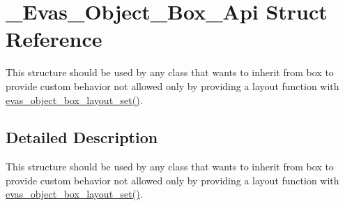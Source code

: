 \section{\_\-Evas\_\-Object\_\-Box\_\-Api Struct Reference}
\label{struct__Evas__Object__Box__Api}


This structure should be used by any class that wants to inherit from box to provide custom behavior not allowed only by providing a layout function with \hyperlink{group__Evas__Object__Box_ga2116d23c11ab08d7c50cbcb588de5570}{evas\_\-object\_\-box\_\-layout\_\-set()}.  




\subsection{Detailed Description}
This structure should be used by any class that wants to inherit from box to provide custom behavior not allowed only by providing a layout function with \hyperlink{group__Evas__Object__Box_ga2116d23c11ab08d7c50cbcb588de5570}{evas\_\-object\_\-box\_\-layout\_\-set()}. 